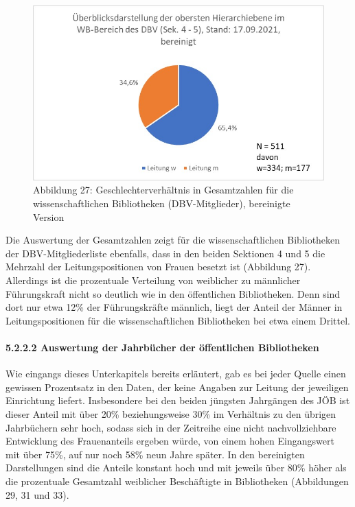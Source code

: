 \documentclass[a4paper,
fontsize=11pt,
oneside,
numbers=noperiodatend,
parskip=half-,
bibliography=totoc,
final
]{scrartcl}
\begin{document}
\begin{figure}
\centering
\includegraphics{img/Abb_27_DBV-Sek4-5_gesamt_bereinigt.jpg}
\caption{Abbildung 27: Geschlechterverhältnis in Gesamtzahlen für die
wissenschaftlichen Bibliotheken (DBV-Mitglieder), bereinigte Version}
\end{figure}

Die Auswertung der Gesamtzahlen zeigt für die wissenschaftlichen
Bibliotheken der DBV-Mitgliederliste ebenfalls, dass in den beiden
Sektionen 4 und 5 die Mehrzahl der Leitungspositionen von Frauen besetzt
ist (Abbildung 27). Allerdings ist die prozentuale Verteilung von
weiblicher zu männlicher Führungskraft nicht so deutlich wie in den
öffentlichen Bibliotheken. Denn sind dort nur etwa 12\% der
Führungskräfte männlich, liegt der Anteil der Männer in
Leitungspositionen für die wissenschaftlichen Bibliotheken bei etwa
einem Drittel.

\paragraph{5.2.2.2 Auswertung der Jahrbücher der öffentlichen Bibliotheken}

Wie eingangs dieses Unterkapitels bereits erläutert, gab es bei jeder
Quelle einen gewissen Prozentsatz in den Daten, der keine Angaben zur
Leitung der jeweiligen Einrichtung liefert. Insbesondere bei den beiden
jüngsten Jahrgängen des JÖB ist dieser Anteil mit über 20\%
beziehungsweise 30\% im Verhältnis zu den übrigen Jahrbüchern sehr hoch,
sodass sich in der Zeitreihe eine nicht nachvollziehbare Entwicklung des
Frauenanteils ergeben würde, von einem hohen Eingangswert mit über 75\%,
auf nur noch 58\% neun Jahre später. In den bereinigten Darstellungen
sind die Anteile konstant hoch und mit jeweils über 80\% höher als die
prozentuale Gesamtzahl weiblicher Beschäftigte in Bibliotheken
(Abbildungen 29, 31 und 33).
\end{document}
